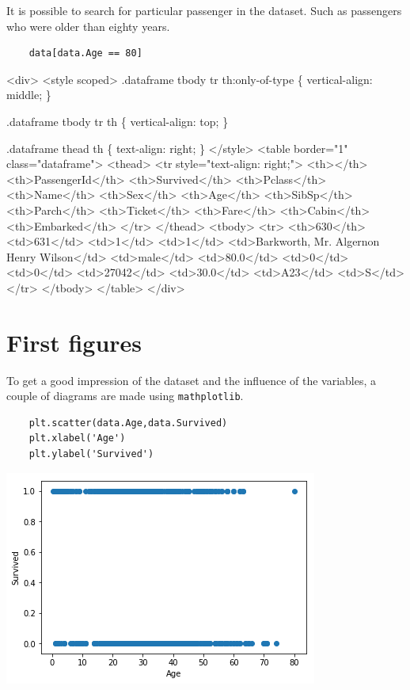 \documentclass[11pt]{article}
\begin{document}
It is possible to search for particular passenger in the dataset. Such
as passengers who were older than eighty years.

\begin{verbatim}
    data[data.Age == 80]
\end{verbatim}

\begin{HTML}
<div>
<style scoped>
    .dataframe tbody tr th:only-of-type \{
	vertical-align: middle;
    \}

.dataframe tbody tr th \{
    vertical-align: top;
\}

    .dataframe thead th \{
	text-align: right;
    \}
</style>
<table border="1" class="dataframe">
  <thead>
    <tr style="text-align: right;">
      <th></th>
      <th>PassengerId</th>
      <th>Survived</th>
      <th>Pclass</th>
      <th>Name</th>
      <th>Sex</th>
      <th>Age</th>
      <th>SibSp</th>
      <th>Parch</th>
      <th>Ticket</th>
      <th>Fare</th>
      <th>Cabin</th>
      <th>Embarked</th>
    </tr>
  </thead>
  <tbody>
    <tr>
      <th>630</th>
      <td>631</td>
      <td>1</td>
      <td>1</td>
      <td>Barkworth, Mr. Algernon Henry Wilson</td>
      <td>male</td>
      <td>80.0</td>
      <td>0</td>
      <td>0</td>
      <td>27042</td>
      <td>30.0</td>
      <td>A23</td>
      <td>S</td>
    </tr>
  </tbody>
</table>
</div>
\end{HTML}

\section{First figures}
\label{first-figures}
To get a good impression of the dataset and the influence of the
variables, a couple of diagrams are made using \texttt{mathplotlib}.

\begin{verbatim}
    plt.scatter(data.Age,data.Survived)
    plt.xlabel('Age')
    plt.ylabel('Survived')
\end{verbatim}

\begin{center}
\includegraphics[width=.9\linewidth]{output_11_1.png}
\end{center}
\end{document}

